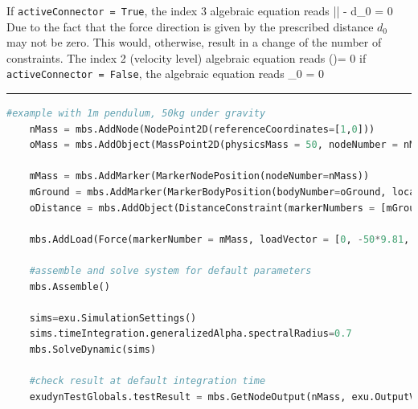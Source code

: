     If \texttt{activeConnector = True}, the index 3 algebraic equation reads
    \be
      \left|\right| - d_0 = 0
    \ee
    Due to the fact that the force direction is given by
    \be
       \eqComma
    \ee
    the prescribed distance $d_0$ may not be zero. This would, otherwise, result in a change of the number of constraints.
    The index 2 (velocity level) algebraic equation reads
    \be
      \left(\right)\tp \Delta\vv = 0
    \ee
    if \texttt{activeConnector = False}, the algebraic equation reads
    \be
      \lambda_0 = 0
    \ee
\vspace{6pt}\par\noindent\rule{\textwidth}{0.4pt}
\label{miniExample_ObjectConnectorDistance}
\pythonstyle
\begin{lstlisting}[language=Python, firstnumber=1]
    #example with 1m pendulum, 50kg under gravity
    nMass = mbs.AddNode(NodePoint2D(referenceCoordinates=[1,0]))
    oMass = mbs.AddObject(MassPoint2D(physicsMass = 50, nodeNumber = nMass))
    
    mMass = mbs.AddMarker(MarkerNodePosition(nodeNumber=nMass))
    mGround = mbs.AddMarker(MarkerBodyPosition(bodyNumber=oGround, localPosition = [0,0,0]))
    oDistance = mbs.AddObject(DistanceConstraint(markerNumbers = [mGround, mMass], distance = 1))
    
    mbs.AddLoad(Force(markerNumber = mMass, loadVector = [0, -50*9.81, 0])) 

    #assemble and solve system for default parameters
    mbs.Assemble()
    
    sims=exu.SimulationSettings()
    sims.timeIntegration.generalizedAlpha.spectralRadius=0.7
    mbs.SolveDynamic(sims)

    #check result at default integration time
    exudynTestGlobals.testResult = mbs.GetNodeOutput(nMass, exu.OutputVariableType.Position)[0]
\end{lstlisting}

